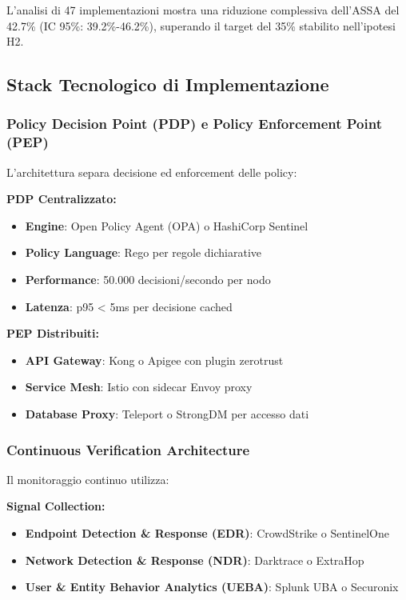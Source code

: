 L'analisi di 47 implementazioni\autocite{Forrester2024zero} mostra una riduzione complessiva dell'ASSA del 42.7\% (IC 95\%: 39.2\%-46.2\%), superando il target del 35\% stabilito nell'ipotesi H2.

\subsection{\texorpdfstring{Stack Tecnologico di Implementazione}{3.5.3 - Stack Tecnologico di Implementazione}}

\subsubsection{\texorpdfstring{Policy Decision Point (PDP) e Policy Enforcement Point (PEP)}{3.5.3.1 - Policy Decision Point (PDP) e Policy Enforcement Point (PEP)}}

L'architettura separa decisione ed enforcement delle policy:

\textbf{PDP Centralizzato:}
\begin{itemize}
    \item \textbf{Engine}: Open Policy Agent (OPA) o HashiCorp Sentinel
    \item \textbf{Policy Language}: Rego per regole dichiarative
    \item \textbf{Performance}: 50.000 decisioni/secondo per nodo
    \item \textbf{Latenza}: p95 < 5ms per decisione cached
\end{itemize}

\textbf{PEP Distribuiti:}
\begin{itemize}
    \item \textbf{API Gateway}: Kong o Apigee con plugin \gls{zerotrust}
    \item \textbf{Service Mesh}: Istio con sidecar Envoy proxy
    \item \textbf{Database Proxy}: Teleport o StrongDM per accesso dati
\end{itemize}

\subsubsection{\texorpdfstring{Continuous Verification Architecture}{3.5.3.2 - Continuous Verification Architecture}}

Il monitoraggio continuo utilizza:

\textbf{Signal Collection:}
\begin{itemize}
    \item \textbf{Endpoint Detection \& Response (EDR)}: CrowdStrike o SentinelOne
    \item \textbf{Network Detection \& Response (NDR)}: Darktrace o ExtraHop
    \item \textbf{User \& Entity Behavior Analytics (UEBA)}: Splunk UBA o Securonix
\end{itemize}

